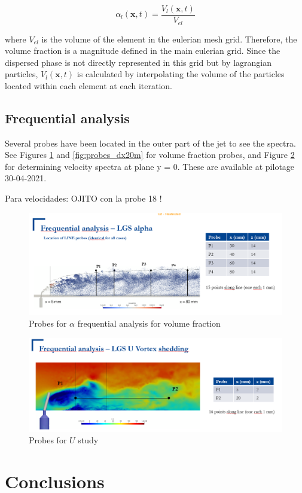\begin{equation}
\alpha_l \left( \textbf{x}, t \right) = \frac{V_l \left( \textbf{x}, t \right)}{V_{el}}
\end{equation}

where $V_{el}$ is the volume of the element in the eulerian mesh grid. Therefore, the volume fraction is a magnitude defined in the main eulerian grid. Since the dispersed phase is not directly represented in this grid but by lagrangian particles, $V_l \left( \textbf{x}, t \right)$ is calculated by interpolating the volume of the particles located within each element at each iteration.

\subsection{Frequential analysis}

Several probes have been located in the outer part of the jet to see the spectra. See Figures \ref{fig:probes_dx10m} and \ref{fig:probes_dx20m} for volume fraction probes, and Figure \ref{fig:probes_U_planey0} for determining velocity spectra at plane y = 0. These are available at pilotage 30-04-2021.

Para velocidades: OJITO con la probe 18 !

\begin{figure}[h!]
	\centering
	\includegraphics[scale=0.7]{./part2_developments/figures_ch6_lagrangian_JICF/probes_vol_frac}
	\caption{Probes for $\alpha$ frequential analysis for volume fraction}
	\label{fig:probes_dx10m}
\end{figure}


\begin{figure}[h!]
	\centering
	\includegraphics[scale=0.7]{./part2_developments/figures_ch6_lagrangian_JICF/probes_U_planey0}
	\caption{Probes for $U$ study}
	\label{fig:probes_U_planey0}
\end{figure}



\section{Conclusions}